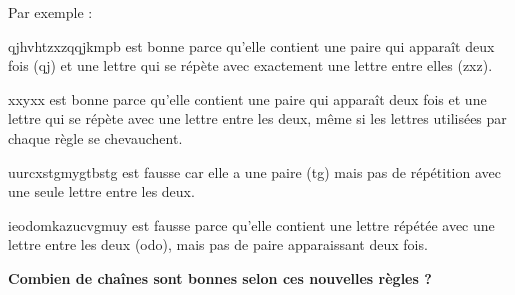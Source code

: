 Par exemple :

    qjhvhtzxzqqjkmpb est bonne parce qu'elle contient une paire qui apparaît deux fois (qj) et une lettre qui se répète avec exactement une lettre entre elles (zxz).

    xxyxx est bonne parce qu'elle contient une paire qui apparaît deux fois et une lettre qui se répète avec une lettre entre les deux, même si les lettres utilisées par chaque règle se chevauchent.
    
    uurcxstgmygtbstg est fausse car elle a une paire (tg) mais pas de répétition avec une seule lettre entre les deux.
    
    ieodomkazucvgmuy est fausse parce qu'elle contient une lettre répétée avec une lettre entre les deux (odo), mais pas de paire apparaissant deux fois.

\textbf{Combien de chaînes sont bonnes selon ces nouvelles règles ?}
